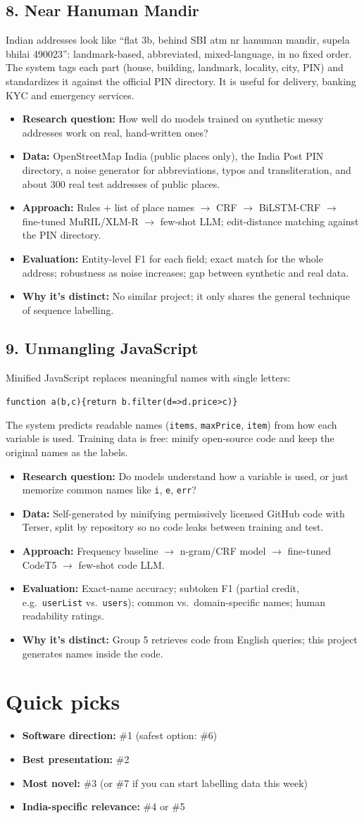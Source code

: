 \documentclass[11pt,a4paper]{article}
\newcommand{\project}[7]{%
  \needspace{14\baselineskip}
  \subsection{#1}
  #2
  \begin{itemize}
    \item \textbf{Research question:} #3
    \item \textbf{Data:} #4
    \item \textbf{Approach:} #5
    \item \textbf{Evaluation:} #6
    \item \textbf{Why it's distinct:} #7
  \end{itemize}}
\begin{document}
\project{8. Near Hanuman Mandir}
  {Indian addresses look like ``flat 3b, behind SBI atm nr hanuman mandir, supela bhilai 490023'':
   landmark-based, abbreviated, mixed-language, in no fixed order. The system tags each part (house,
   building, landmark, locality, city, PIN) and standardizes it against the official PIN directory.
   It is useful for delivery, banking KYC and emergency services.}
  {How well do models trained on synthetic messy addresses work on real, hand-written ones?}
  {OpenStreetMap India (public places only), the India Post PIN directory, a noise generator for
   abbreviations, typos and transliteration, and about 300 real test addresses of public places.}
  {Rules + list of place names $\to$ CRF $\to$ BiLSTM-CRF $\to$ fine-tuned MuRIL/XLM-R $\to$
   few-shot LLM; edit-distance matching against the PIN directory.}
  {Entity-level F1 for each field; exact match for the whole address; robustness as noise
   increases; gap between synthetic and real data.}
  {No similar project; it only shares the general technique of sequence labelling.}

\project{9. Unmangling JavaScript}
  {Minified JavaScript replaces meaningful names with single letters:
   \begin{center}\small\texttt{function a(b,c)\{return b.filter(d=>d.price>c)\}}\end{center}
   The system predicts readable names
   (\texttt{items}, \texttt{maxPrice}, \texttt{item}) from how each variable is used. Training
   data is free: minify open-source code and keep the original names as the labels.}
  {Do models understand how a variable is used, or just memorize common names like
   \texttt{i}, \texttt{e}, \texttt{err}?}
  {Self-generated by minifying permissively licensed GitHub code with Terser, split by repository
   so no code leaks between training and test.}
  {Frequency baseline $\to$ n-gram/CRF model $\to$ fine-tuned CodeT5 $\to$ few-shot code LLM.}
  {Exact-name accuracy; subtoken F1 (partial credit, e.g.\ \texttt{userList} vs.\ \texttt{users});
   common vs.\ domain-specific names; human readability ratings.}
  {Group 5 retrieves code from English queries; this project generates names inside the code.}

\section*{Quick picks}
\begin{itemize}
  \item \textbf{Software direction:} \#1 (safest option: \#6)
  \item \textbf{Best presentation:} \#2
  \item \textbf{Most novel:} \#3 (or \#7 if you can start labelling data this week)
  \item \textbf{India-specific relevance:} \#4 or \#5
\end{itemize}
\end{document}
